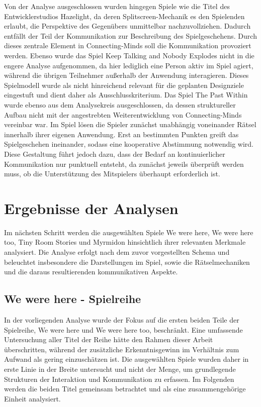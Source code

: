 Von der Analyse ausgeschlossen wurden hingegen Spiele wie die Titel des Entwicklerstudios Hazelight, da deren Splitscreen-Mechanik es den Spielenden erlaubt, die Perspektive des Gegenübers unmittelbar nachzuvollziehen. Dadurch entfällt der Teil der Kommunikation zur Beschreibung des Spielgeschehens. Durch dieses zentrale Element in Connecting-Minds soll die Kommunikation provoziert werden. Ebenso wurde das Spiel Keep Talking and Nobody Explodes nicht in die engere Analyse aufgenommen, da hier lediglich eine Person aktiv im Spiel agiert, während die übrigen Teilnehmer außerhalb der Anwendung interagieren. Dieses Spielmodell wurde als nicht hinreichend relevant für die geplanten Designziele eingestuft und dient daher als Ausschlusskriterium. Das Spiel The Past Within wurde ebenso aus dem Analysekreis ausgeschlossen, da dessen struktureller Aufbau nicht mit der angestrebten Weiterentwicklung von Connecting-Minds vereinbar war. Im Spiel lösen die Spieler zunächst unabhängig voneinander Rätsel innerhalb ihrer eigenen Anwendung. Erst an bestimmten Punkten greift das Spielgeschehen ineinander, sodass eine kooperative Abstimmung notwendig wird. Diese Gestaltung führt jedoch dazu, dass der Bedarf an kontinuierlicher Kommunikation nur punktuell entsteht, da zunächst jeweils überprüft werden muss, ob die Unterstützung des Mitspielers überhaupt erforderlich ist.

\section{Ergebnisse der Analysen}

Im nächsten Schritt werden die ausgewählten Spiele We were here, We were here too, Tiny Room Stories und Myrmidon hinsichtlich ihrer relevanten Merkmale analysiert. Die Analyse erfolgt nach dem zuvor vorgestellten Schema und beleuchtet insbesondere die Darstellungen im Spiel, sowie die Rätselmechaniken und die daraus resultierenden kommunikativen Aspekte.

\subsection{We were here - Spielreihe}
In der vorliegenden Analyse wurde der Fokus auf die ersten beiden Teile der Spielreihe, We were here und We were here too, beschränkt. Eine umfassende Untersuchung aller Titel der Reihe hätte den Rahmen dieser Arbeit überschritten, während der zusätzliche Erkenntnisgewinn im Verhältnis zum Aufwand als gering einzuschätzen ist. Die ausgewählten Spiele wurden daher in erste Linie in der Breite untersucht und nicht der Menge, um grundlegende Strukturen der Interaktion und Kommunikation zu erfassen. Im Folgenden werden die beiden Titel gemeinsam betrachtet und als eine zusammengehörige Einheit analysiert.

